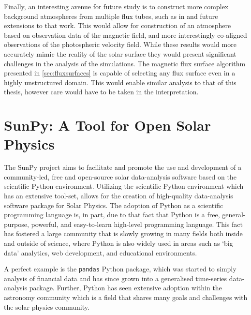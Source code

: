 \documentclass[a4paper,12pt,fourier,authoryear,custommargin]{Classes/PhDThesisPSnPDF}
\begin{document}
Finally, an interesting avenue for future study is to construct more complex background atmospheres from multiple flux tubes, such as in \cite{gent2014} and future extensions to that work.
This would allow for construction of an atmosphere based on observation data of the magnetic field, and more interestingly co-aligned observations of the photospheric velocity field.
While these results would more accurately mimic the reality of the solar surface they would present significant challenges in the analysis of the simulations.
The magnetic flux surface algorithm presented in \cref{sec:fluxsurfaces} is capable of selecting any flux surface even in a highly unstructured domain.
This would enable similar analysis to that of this thesis, however care would have to be taken in the interpretation.
\clearpage{}%
%

%
\clearpage{}%

\chapter{SunPy: A Tool for Open Solar Physics}\label{ch:sunpy}

The SunPy project \citep{thesunpycommunity2015a} aims to facilitate and promote the use and development of a community-led, free and open-source solar data-analysis software based on the scientific Python environment.
Utilizing the scientific Python environment which has an extensive tool-set, allows for the creation of high-quality data-analysis software package for Solar Physics.
The adoption of Python as a scientific programming language is, in part, due to that fact that Python is a free, general-purpose, powerful, and easy-to-learn high-level programming language.
This fact has fostered a large community that is slowly growing in many fields both inside and outside of science, where Python is also widely used in areas such as `big data' analytics, web development, and educational environments.

A perfect example is the \texttt{pandas} \citep{mckinney2010, mckinney2012} Python package, which was started to simply analysis of financial data and has since grown into a generalised time-series data-analysis package.
Further, Python has seen extensive adoption within the astronomy community \citep{greenfield2011} which is a field that shares many goals and challenges with the solar physics community.
\end{document}
